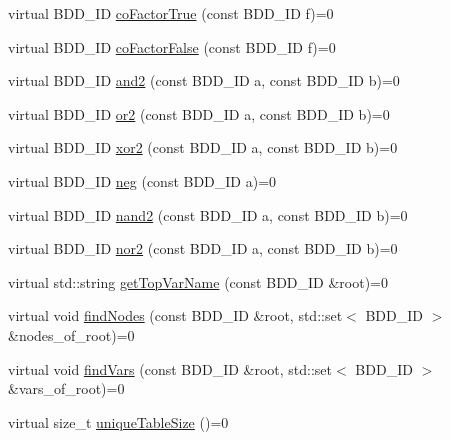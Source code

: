 \begin{DoxyCompactItemize}
\item 
virtual B\+D\+D\+\_\+\+ID \hyperlink{classClassProject_1_1ManagerInterface_a4a1880d2245af9130646232551940949}{co\+Factor\+True} (const B\+D\+D\+\_\+\+ID f)=0
\item 
virtual B\+D\+D\+\_\+\+ID \hyperlink{classClassProject_1_1ManagerInterface_a308c99661ad02f407d6f2b0af6230e80}{co\+Factor\+False} (const B\+D\+D\+\_\+\+ID f)=0
\item 
virtual B\+D\+D\+\_\+\+ID \hyperlink{classClassProject_1_1ManagerInterface_af914326d34a1ed42710f7b11e5baf010}{and2} (const B\+D\+D\+\_\+\+ID a, const B\+D\+D\+\_\+\+ID b)=0
\item 
virtual B\+D\+D\+\_\+\+ID \hyperlink{classClassProject_1_1ManagerInterface_a8dbfde761b1e94d1f222b4d27f3c6fbc}{or2} (const B\+D\+D\+\_\+\+ID a, const B\+D\+D\+\_\+\+ID b)=0
\item 
virtual B\+D\+D\+\_\+\+ID \hyperlink{classClassProject_1_1ManagerInterface_a2b2c4948ef41ddb1036289cd07dac156}{xor2} (const B\+D\+D\+\_\+\+ID a, const B\+D\+D\+\_\+\+ID b)=0
\item 
virtual B\+D\+D\+\_\+\+ID \hyperlink{classClassProject_1_1ManagerInterface_a57d34af3121dcf5366d22ecf792f05a0}{neg} (const B\+D\+D\+\_\+\+ID a)=0
\item 
virtual B\+D\+D\+\_\+\+ID \hyperlink{classClassProject_1_1ManagerInterface_aaf6e357d680613e449d3ea958c9abba1}{nand2} (const B\+D\+D\+\_\+\+ID a, const B\+D\+D\+\_\+\+ID b)=0
\item 
virtual B\+D\+D\+\_\+\+ID \hyperlink{classClassProject_1_1ManagerInterface_a312d9865eae2d6355e17855cba78bc78}{nor2} (const B\+D\+D\+\_\+\+ID a, const B\+D\+D\+\_\+\+ID b)=0
\item 
virtual std\+::string \hyperlink{classClassProject_1_1ManagerInterface_afde45b2065361dfa6e61c1c7bc3fc1b4}{get\+Top\+Var\+Name} (const B\+D\+D\+\_\+\+ID \&root)=0
\item 
virtual void \hyperlink{classClassProject_1_1ManagerInterface_ab460e331ffdb85d4128574b3aae72c1e}{find\+Nodes} (const B\+D\+D\+\_\+\+ID \&root, std\+::set$<$ B\+D\+D\+\_\+\+ID $>$ \&nodes\+\_\+of\+\_\+root)=0
\item 
virtual void \hyperlink{classClassProject_1_1ManagerInterface_ab94feabca2125d334e542e502ae0186d}{find\+Vars} (const B\+D\+D\+\_\+\+ID \&root, std\+::set$<$ B\+D\+D\+\_\+\+ID $>$ \&vars\+\_\+of\+\_\+root)=0
\item 
virtual size\+\_\+t \hyperlink{classClassProject_1_1ManagerInterface_a85cac80444b26e5b80eb96b9f1231c0e}{unique\+Table\+Size} ()=0
\end{DoxyCompactItemize}


